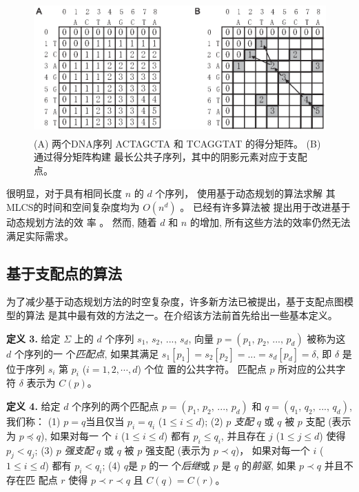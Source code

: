 \begin{figure}[!h]
  \centering
  \includegraphics[height=2in, width=4.5in]{figures/4_MLCS/DM}
  \caption{(A) 两个DNA序列 ACTAGCTA 和 TCAGGTAT 的得分矩阵。 (B) 通过得分矩阵构建
    最长公共子序列，其中的阴影元素对应于支配点。}
\label{fig:DM}
\end{figure}

很明显，对于具有相同长度 $n$ 的 $d$ 个序列， 使用基于动态规划的算法求解
其MLCS的时间和空间复杂度均为 $O(n^d)$ \cite{Hsu1984}。 已经有许多算法被
提出用于改进基于动态规划方法的效
率 \cite{Hirschberg1977,Apostolico1992,Masek1980,Rick1994}。 然而, 随着
$d$ 和 $n$ 的增加, 所有这些方法的效率仍然无法满足实际需求。

\subsection{基于支配点的算法}
\label{sec:Dominant Point}

为了减少基于动态规划方法的时空复杂度，许多新方法已被提出，基于支配点图模型的算法
是其中最有效的方法之一。在介绍该方法前首先给出一些基本定义。

\textbf{定义 3.} 给定 $\Sigma$ 上的 $d$ 个序列 $s_1,\, s_2,\, ...,\,
s_d$, 向量 $p = (p_1,\, p_2,\, ...,\, p_d)$ 被称为这 $d$ 个序列的一
个\emph{匹配点}, 如果其满足 $s_1[p_1] = s_2[p_2] = ... = s_d[p_d] =
\delta$, 即 $\delta$ 是位于序列 $s_i$ 第 $p_i$ ($i=1,2,\cdots,d$) 个位
置的公共字符。 匹配点 $p$ 所对应的公共字符 $\delta$ 表示为 $C(p)$。

\textbf{定义 4.} 给定 $d$ 个序列的两个匹配点 $p = (p_1,\, p_2,\,
...,\, p_d)$ 和 $q = (q_1,\, q_2,\, ...,\, q_d)$, 我们称： (1) $p =
q$当且仅当 $p_i = q_i$ ($1 \leq i \leq d$); (2) $p$
\emph{支配 }$q$ 或 $q$ 被 $p$ 支配 (表示为 $p \preceq q$), 如果对每一
个 $i$ ($1 \leq i \leq d$) 都有 $p_i \leq q_i$, 并且存在 $j$
($1 \leq j \leq d$) 使得 $p_j<q_j$; (3) $p$ \emph{强支配}
$q$ 或 $q$ 被 $p$ 强支配 (表示为 $p \prec q$)， 如果对每一个 $i$ ($1
\leq i \leq d$) 都有 $p_i < q_i$; (4) $q$是 $p$ 的一
个\emph{后继}或 $p$ 是 $q$ 的\emph{前驱}, 如果 $p \prec q$ 并且不存在匹
配点 $r$ 使得 $p \prec r \prec q$ 且 $C(q) = C(r)$。

